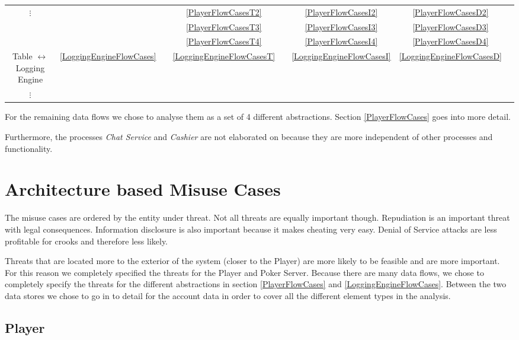 \documentclass[a4paper,11pt]{report}
\begin{document}
\begin{center}
\begin{tabular}{| c || c || c | c | c | c | c | c |}
  $\vdots$		& 				&	& \ref{PlayerFlowCasesT2}	&	& \ref{PlayerFlowCasesI2}	& \ref{PlayerFlowCasesD2}	&	\\
  			&				&	& \ref{PlayerFlowCasesT3}	&	& \ref{PlayerFlowCasesI3}	& \ref{PlayerFlowCasesD3}	\\
  			&				&	& \ref{PlayerFlowCasesT4}	&	& \ref{PlayerFlowCasesI4}	& \ref{PlayerFlowCasesD4}	\\\hline
  Table $\leftrightarrow$
  Logging Engine 	& \ref{LoggingEngineFlowCases}	&	& \ref{LoggingEngineFlowCasesT}	&	& \ref{LoggingEngineFlowCasesI}	& \ref{LoggingEngineFlowCasesD}	&	\\
  $\vdots$		& 				&	& 	&	& 	& 	&	\\\hline
\end{tabular}
\end{center}
\vspace{0.3cm}

For the remaining data flows we chose to analyse them as a set of 4 different abstractions. Section \ref{PlayerFlowCases} goes into more detail.

Furthermore, the processes \textit{Chat Service} and \textit{Cashier} are not elaborated on because they are more independent of other processes and functionality.

\section{Architecture based Misuse Cases}
\label{MisUseCases}

The misuse cases are ordered by the entity under threat. Not all threats are equally important though. Repudiation is an important threat with legal consequences. Information disclosure is also important because it makes cheating very easy. Denial of Service attacks are less profitable for crooks and therefore less likely.

Threats that are located more to the exterior of the system (closer to the Player) are more likely to be feasible and are more important. For this reason we completely specified the threats for the Player and Poker Server. Because there are many data flows, we chose to completely specify the threats for the different abstractions in section \ref{PlayerFlowCases} and \ref{LoggingEngineFlowCases}. Between the two data stores we chose to go in to detail for the account data in order to cover all the different element types in the analysis.

\subsection{Player}
\label{PlayerCases}
\end{document}

